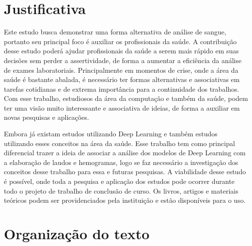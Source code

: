 

\section{Justificativa}
\label{sec:justificativa}
Este estudo busca demonstrar uma forma alternativa de análise de sangue, portanto seu principal foco é auxiliar os profissionais da saúde. A contribuição desse estudo poderá ajudar profissionais da saúde a serem mais rápido em suas decisões sem perder a assertividade, de forma a aumentar a eficiência da análise de exames laboratoriais. Principalmente em momentos de crise, onde a área da saúde é bastante abalada, é necessário ter formas alternativas e associativas em tarefas cotidianas e de extrema importância para a continuidade dos trabalhos. Com esse trabalho, estudiosos da área da computação e também da saúde, podem ter uma visão muito interessante e associativa de ideias, de forma a auxiliar em novas pesquisas e aplicações.

Embora já existam estudos utilizando Deep Learning e também estudos utilizando esses conceitos na área da saúde. Esse trabalho tem como principal diferencial trazer a ideia de associar a análise dos modelos de Deep Learning com a elaboração de laudos e hemogramas, logo se faz necessário a investigação dos conceitos desse trabalho para essa e futuras pesquisas. A viabilidade desse estudo é possível, onde toda a pesquisa e aplicação dos estudos pode ocorrer durante todo o projeto de trabalho de conclusão de curso. Os livros, artigos e materiais teóricos podem ser providenciados pela instituição e estão disponíveis para o uso.


\section{Organização do texto}
\label{sec:organizacao}

